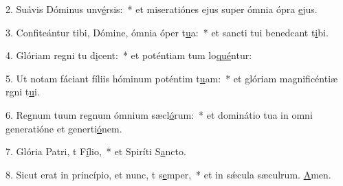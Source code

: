 2. Suávis Dóminus unv\uline{é}rsis:~* et miseratiónes ejus super ómnia ópra \uline{e}jus.\par 
3. Confiteántur tibi, Dómine, ómnia óper t\uline{u}a:~* et sancti tui benedcant t\uline{i}bi.\par 
4. Glóriam regni tu d\uline{i}cent:~* et poténtiam tum lo\uline{qué}ntur:\par 
5. Ut notam fáciant fíliis hóminum poténtim t\uline{u}am:~* et glóriam magnificéntiæ rgni t\uline{u}i.\par 
6. Regnum tuum regnum ómnium sæcl\uline{ó}rum:~* et dominátio tua in omni generatióne et generti\uline{ó}nem.\par 
7. Glória Patri, t F\uline{í}lio,~* et Spiríti S\uline{a}ncto.\par 
8. Sicut erat in princípio, et nunc, t s\uline{e}mper,~* et in sǽcula sæculrum. \uline{A}men.\par 
